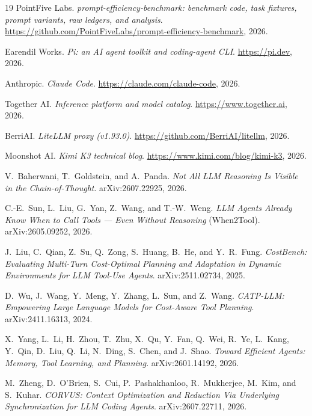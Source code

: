 \documentclass[11pt]{article}
\begin{document}
\begin{thebibliography}{19}
PointFive Labs. \emph{prompt-efficiency-benchmark: benchmark code, task fixtures,
prompt variants, raw ledgers, and analysis}.
\url{https://github.com/PointFiveLabs/prompt-efficiency-benchmark}, 2026.

Earendil Works. \emph{Pi: an AI agent toolkit and coding-agent CLI}.
\url{https://pi.dev}, 2026.

Anthropic. \emph{Claude Code}. \url{https://claude.com/claude-code}, 2026.

Together AI. \emph{Inference platform and model catalog}.
\url{https://www.together.ai}, 2026.

BerriAI. \emph{LiteLLM proxy (v1.93.0)}.
\url{https://github.com/BerriAI/litellm}, 2026.

Moonshot AI. \emph{Kimi K3 technical blog}.
\url{https://www.kimi.com/blog/kimi-k3}, 2026.

V.~Baherwani, T.~Goldstein, and A.~Panda.
\emph{Not All LLM Reasoning Is Visible in the Chain-of-Thought}.
arXiv:2607.22925, 2026.

C.-E.~Sun, L.~Liu, G.~Yan, Z.~Wang, and T.-W.~Weng.
\emph{LLM Agents Already Know When to Call Tools --- Even Without
Reasoning} (When2Tool). arXiv:2605.09252, 2026.

J.~Liu, C.~Qian, Z.~Su, Q.~Zong, S.~Huang, B.~He, and Y.~R.~Fung.
\emph{CostBench: Evaluating Multi-Turn Cost-Optimal Planning and
Adaptation in Dynamic Environments for LLM Tool-Use Agents}.
arXiv:2511.02734, 2025.

D.~Wu, J.~Wang, Y.~Meng, Y.~Zhang, L.~Sun, and Z.~Wang.
\emph{CATP-LLM: Empowering Large Language Models for Cost-Aware Tool
Planning}. arXiv:2411.16313, 2024.

X.~Yang, L.~Li, H.~Zhou, T.~Zhu, X.~Qu, Y.~Fan, Q.~Wei, R.~Ye, L.~Kang,
Y.~Qin, D.~Liu, Q.~Li, N.~Ding, S.~Chen, and J.~Shao.
\emph{Toward Efficient Agents: Memory, Tool Learning, and Planning}.
arXiv:2601.14192, 2026.

M.~Zheng, D.~O'Brien, S.~Cui, P.~Pashakhanloo, R.~Mukherjee, M.~Kim, and
S.~Kuhar.
\emph{CORVUS: Context Optimization and Reduction Via Underlying
Synchronization for LLM Coding Agents}. arXiv:2607.22711, 2026.
\end{thebibliography}

\appendix


\end{document}
